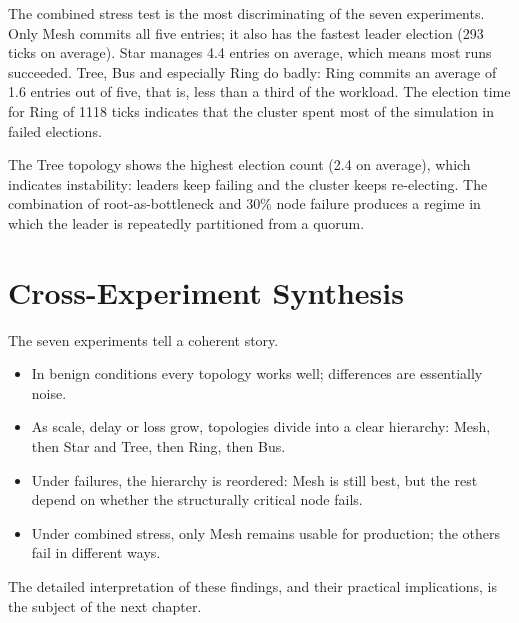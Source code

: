 The combined stress test is the most discriminating of the seven experiments. Only Mesh commits all five entries; it also has the fastest leader election (293 ticks on average). Star manages 4.4 entries on average, which means most runs succeeded. Tree, Bus and especially Ring do badly: Ring commits an average of 1.6 entries out of five, that is, less than a third of the workload. The election time for Ring of 1118 ticks indicates that the cluster spent most of the simulation in failed elections.

The Tree topology shows the highest election count (2.4 on average), which indicates instability: leaders keep failing and the cluster keeps re-electing. The combination of root-as-bottleneck and 30\% node failure produces a regime in which the leader is repeatedly partitioned from a quorum.

\section{Cross-Experiment Synthesis}

The seven experiments tell a coherent story.

\begin{itemize}
    \item In benign conditions every topology works well; differences are essentially noise.
    \item As scale, delay or loss grow, topologies divide into a clear hierarchy: Mesh, then Star and Tree, then Ring, then Bus.
    \item Under failures, the hierarchy is reordered: Mesh is still best, but the rest depend on whether the structurally critical node fails.
    \item Under combined stress, only Mesh remains usable for production; the others fail in different ways.
\end{itemize}

The detailed interpretation of these findings, and their practical implications, is the subject of the next chapter.

